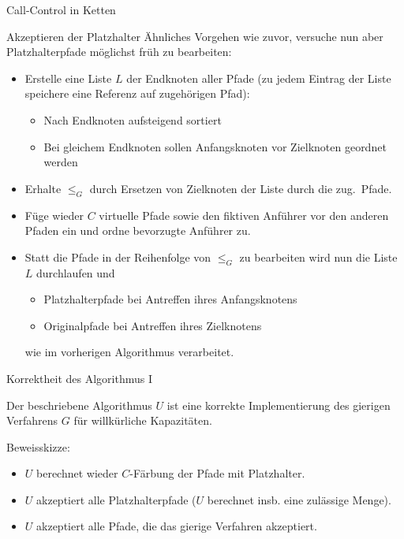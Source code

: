 \begin{section}{Call-Control in Ketten}
\begin{frame}{Akzeptieren der Platzhalter}
	\pause Ähnliches Vorgehen wie zuvor, versuche nun aber Platzhalterpfade möglichst früh zu bearbeiten:
	\begin{itemize}
		\pause\item Erstelle eine Liste $L$ der Endknoten aller Pfade (zu jedem Eintrag der Liste speichere eine Referenz auf zugehörigen Pfad):
		\pause\begin{itemize}
			\item Nach Endknoten aufsteigend sortiert
			\item Bei gleichem Endknoten sollen Anfangsknoten vor Zielknoten geordnet werden
		\end{itemize}
		\pause\item Erhalte $\leq_G$ durch Ersetzen von Zielknoten der Liste durch die zug.\ Pfade.
		\pause\item Füge wieder $C$ virtuelle Pfade sowie den fiktiven Anführer vor den anderen Pfaden ein und ordne bevorzugte Anführer zu.
		\pause\item Statt die Pfade in der Reihenfolge von $\leq_G$ zu bearbeiten wird nun die Liste $L$ durchlaufen und
		\begin{itemize}
			\item Platzhalterpfade bei Antreffen ihres Anfangsknotens
			\item Originalpfade bei Antreffen ihres Zielknotens
		\end{itemize}
	 wie im vorherigen Algorithmus verarbeitet.
	\end{itemize}
\end{frame}

\begin{frame}{Korrektheit des Algorithmus I}
	\begin{lemma}
		Der beschriebene Algorithmus $U$ ist eine korrekte Implementierung des gierigen Verfahrens $G$ für willkürliche Kapazitäten.
	\end{lemma}
	Beweisskizze: 
	\begin{itemize}
		\pause\item $U$ berechnet wieder $C$-Färbung der Pfade mit Platzhalter.
		\pause\item $U$ akzeptiert alle Platzhalterpfade ($U$ berechnet insb. eine zulässige Menge).
		\pause\item $U$ akzeptiert alle Pfade, die das gierige Verfahren akzeptiert.
	\end{itemize}
\end{frame}


\end{section}
